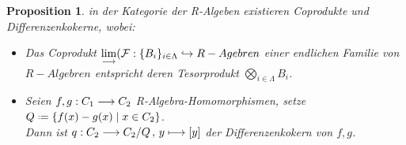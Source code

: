 \documentclass[10pt,a4paper]{report}
\newcounter{Aussage}[chapter]
\newtheorem{prop}[Aussage]{Proposition}
\newcommand{\functionfront}[3]{\nolinebreak{#1:#2 \longrightarrow #3}}
\newcommand{\function}[5]{\nolinebreak{#1:#2 \longrightarrow #3 \, , \, #4 \longmapsto #5}}
\newcommand{\colimes}[0]{\lim\limits_{ \longrightarrow }}
\newcommand{\infunctionfront}[3]{\nolinebreak{#1:#2 \hookrightarrow #3}}
\newcommand*{\defeq}{\mathrel{\vcenter{\baselineskip0.5ex \lineskiplimit0pt
                     \hbox{\scriptsize.}\hbox{\scriptsize.}}}%
                     =}
\begin{document}
\begin{prop} \label{R-Algebra-Coprodukt,Differenzenkokern}
in der Kategorie der R-Algeben existieren Coprodukte und Differenzenkokerne, wobei:
\begin{itemize}
\item[\textbf{1.}] Das Coprodukt $\colimes (\infunctionfront{\mathcal{F}}{\lbrace B_i \rbrace_{i \in \Lambda}}{R-Agebren}$ einer endlichen Familie von $R-Algebren$ entspricht deren Tesorprodukt $\bigotimes_{i \in \Lambda} B_i$. 
\item[\textbf{2.}] Seien $\functionfront{f,g}{C_1}{C_2}$ R-Algebra-Homomorphismen, setze $Q \defeq \lbrace f(x) - g(x)\mid x \in C_2 \rbrace$.\\
Dann ist $\function{q}{C_2}{C_2/Q}{y}{[y]}$ der Differenzenkokern von $f,g$.
\end{itemize}
\end{prop}
\end{document}
